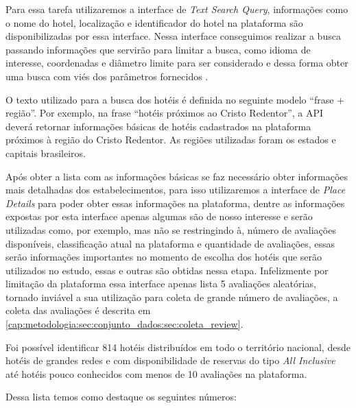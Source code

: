 Para essa tarefa utilizaremos a interface de \emph{Text Search Query}, informações como o nome do hotel, localização e identificador do hotel na plataforma são disponibilizadas por essa interface. Nessa interface conseguimos realizar a busca passando informações que servirão para limitar a busca, como idioma de interesse, coordenadas e diâmetro limite para ser considerado e dessa forma obter uma busca com viés dos parâmetros fornecidos \cite{placesSearchText2023}.



O texto utilizado para a busca dos hotéis é definida no seguinte modelo “frase + região”. Por exemplo, na frase “hotéis próximos ao Cristo Redentor”, a API deverá retornar informações básicas de hotéis cadastrados na plataforma próximos à região do Cristo Redentor. As regiões utilizadas foram os estados e capitais brasileiros.

Após obter a lista com as informações básicas se faz necessário obter informações mais detalhadas dos estabelecimentos, para isso utilizaremos a interface de \emph{Place Details} para poder obter essas informações na plataforma, dentre as informações expostas por esta interface apenas algumas são de nosso interesse e serão utilizadas como, por exemplo, mas não se restringindo à, número de avaliações disponíveis, classificação atual na plataforma e quantidade de avaliações, essas serão informações importantes no momento de escolha dos hotéis que serão utilizados no estudo, essas e outras são obtidas nessa etapa. Infelizmente por limitação da plataforma essa interface apenas lista 5 avaliações aleatórias, tornado inviável a sua utilização para coleta de grande número de avaliações, a coleta das avaliações é descrita em \ref{cap:metodologia:sec:conjunto_dados:sec:coleta_review}.



Foi possível identificar 814 hotéis distribuídos em todo o território nacional, desde hotéis de grandes redes e com disponibilidade de reservas do tipo \emph{All Inclusive} até hotéis pouco conhecidos com menos de 10 avaliações na plataforma.

Dessa lista temos como destaque os seguintes números:

